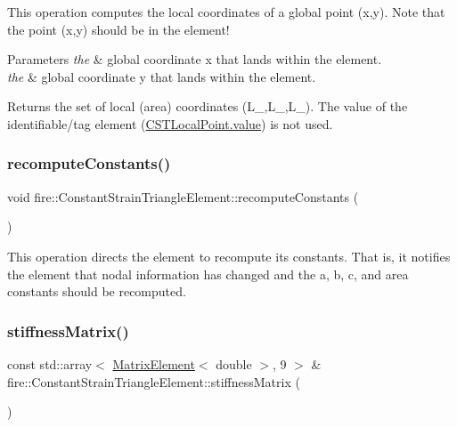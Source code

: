 This operation computes the local coordinates of a global point (x,y). Note that the point (x,y) should be in the element! 
\begin{DoxyParams}{Parameters}
{\em the} & global coordinate x that lands within the element. \\
\hline
{\em the} & global coordinate y that lands within the element. \\
\hline
\end{DoxyParams}
\begin{DoxyReturn}{Returns}
the set of local (area) coordinates (L\+\_,L\+\_,L\+\_). The value of the identifiable/tag element (\hyperlink{a00772_a4aa238990585cb35d1902140ebe6fb9f}{C\+S\+T\+Local\+Point.\+value}) is not used. 
\end{DoxyReturn}
\mbox{\label{a00764_a40cf9432221b62db76e8b154e3e81e3d}} 
\subsubsection{\texorpdfstring{recompute\+Constants()}{recomputeConstants()}}
{\footnotesize\ttfamily void fire\+::\+Constant\+Strain\+Triangle\+Element\+::recompute\+Constants (\begin{DoxyParamCaption}{ }\end{DoxyParamCaption})}

This operation directs the element to recompute its constants. That is, it notifies the element that nodal information has changed and the a, b, c, and area constants should be recomputed. \mbox{\label{a00764_a6da0892a84128d73e1186aeb69a37723}} 
\subsubsection{\texorpdfstring{stiffness\+Matrix()}{stiffnessMatrix()}}
{\footnotesize\ttfamily const std\+::array$<$ \hyperlink{a00189_a1a12603621e7a1efa59ac5cb79f9d509}{Matrix\+Element}$<$ double $>$, 9 $>$ \& fire\+::\+Constant\+Strain\+Triangle\+Element\+::stiffness\+Matrix (\begin{DoxyParamCaption}{ }\end{DoxyParamCaption})}

